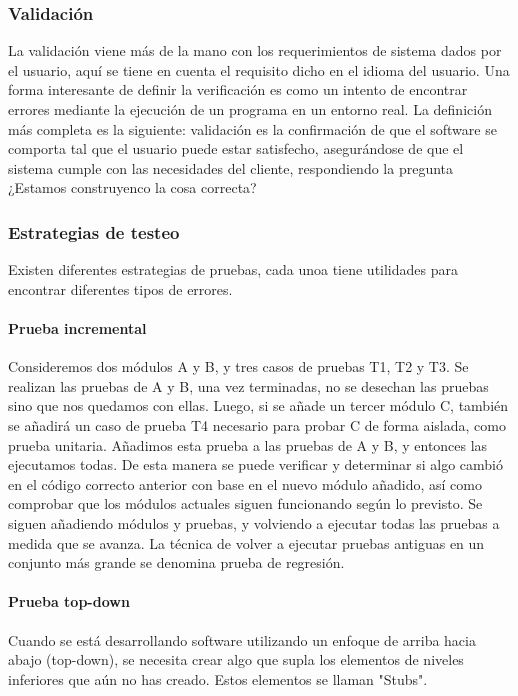 \subsubsection{Validación} La validación viene más de la mano con los requerimientos de sistema dados por el usuario, aquí se tiene en cuenta el requisito dicho en el idioma del usuario. Una forma interesante de definir la verificación es como un intento de encontrar errores mediante la ejecución de un programa en un entorno real. La definición más completa es la siguiente: validación es la confirmación de que el software se comporta tal que el usuario puede estar satisfecho, asegurándose de que el sistema cumple con las necesidades del cliente, respondiendo la pregunta ¿Estamos construyenco la cosa correcta?

\subsubsection{Estrategias de testeo} Existen diferentes estrategias de pruebas, cada unoa tiene utilidades para encontrar diferentes tipos de errores. 

\paragraph{Prueba incremental} Consideremos dos módulos A y B, y tres casos de pruebas T1, T2 y T3. Se realizan las pruebas de A y B, una vez terminadas, no se desechan las pruebas sino que nos quedamos con ellas. Luego, si se añade un tercer módulo C, también se añadirá un caso de prueba T4 necesario para probar C de forma aislada, como prueba unitaria. Añadimos esta prueba a las pruebas de A y B, y entonces las ejecutamos todas. De esta manera se puede verificar y determinar si algo cambió en el código correcto anterior con base en el nuevo módulo añadido, así como comprobar que los módulos actuales siguen funcionando según lo previsto. Se siguen añadiendo módulos y pruebas, y volviendo a ejecutar todas las pruebas a medida que se avanza. La técnica de volver a ejecutar pruebas antiguas en un conjunto más grande se denomina prueba de regresión. 

\paragraph{Prueba top-down} Cuando se está desarrollando software utilizando un enfoque de arriba hacia abajo (top-down), se necesita crear algo que supla los elementos de niveles inferiores que aún no has creado. Estos elementos se llaman "Stubs". 

